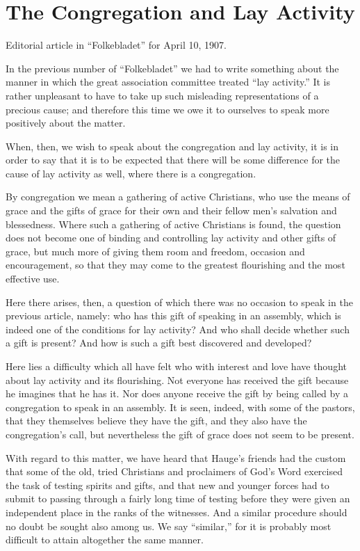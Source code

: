 
\section{The Congregation and Lay Activity}

Editorial article in “Folkebladet” for April 10, 1907.

In the previous number of “Folkebladet” we had to write something about the manner in which the great association committee treated “lay activity.” It is rather unpleasant to have to take up such misleading representations of a precious cause; and therefore this time we owe it to ourselves to speak more positively about the matter.

When, then, we wish to speak about the congregation and lay activity, it is in order to say that it is to be expected that there will be some difference for the cause of lay activity as well, where there is a congregation.

By congregation we mean a gathering of active Christians, who use the means of grace and the gifts of grace for their own and their fellow men’s salvation and blessedness. Where such a gathering of active Christians is found, the question does not become one of binding and controlling lay activity and other gifts of grace, but much more of giving them room and freedom, occasion and encouragement, so that they may come to the greatest flourishing and the most effective use.

Here there arises, then, a question of which there was no occasion to speak in the previous article, namely: who has this gift of speaking in an assembly, which is indeed one of the conditions for lay activity? And who shall decide whether such a gift is present? And how is such a gift best discovered and developed?

Here lies a difficulty which all have felt who with interest and love have thought about lay activity and its flourishing. Not everyone has received the gift because he imagines that he has it. Nor does anyone receive the gift by being called by a congregation to speak in an assembly. It is seen, indeed, with some of the pastors, that they themselves believe they have the gift, and they also have the congregation’s call, but nevertheless the gift of grace does not seem to be present.

With regard to this matter, we have heard that Hauge’s friends had the custom that some of the old, tried Christians and proclaimers of God’s Word exercised the task of testing spirits and gifts, and that new and younger forces had to submit to passing through a fairly long time of testing before they were given an independent place in the ranks of the witnesses. And a similar procedure should no doubt be sought also among us. We say “similar,” for it is probably most difficult to attain altogether the same manner.

